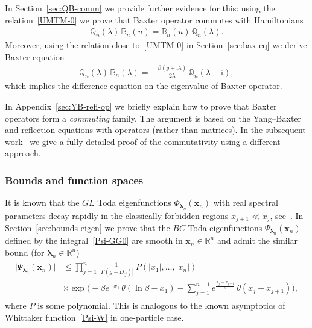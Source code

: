 \documentclass[11pt]{article}
\numberwithin{equation}{section}
\theoremstyle{plain}
\theoremstyle{definition}
\newcommand{\B}{\mathbb{B}}
\newcommand{\QQ}{\mathbb{Q}}
\renewcommand{\imath}{\mathrm{i}}
\begin{document}
In Section~\ref{sec:QB-comm} we provide further evidence for this: using the relation~\eqref{UMTM-0} we prove that Baxter operator commutes with Hamiltonians
\begin{align}
	\QQ_n(\lambda) \, \B_n(u) = \B_n(u) \, \QQ_n(\lambda).
\end{align}
Moreover, using the relation close to~\eqref{UMTM-0} in Section~\ref{sec:bax-eq} we derive Baxter equation
\begin{align} \label{baxt-eq}
	\QQ_n(\lambda)\,\B_n(\lambda)  = - \frac{\beta (g + \imath \lambda)}{2\lambda} \,\QQ_n(\lambda-\imath),
\end{align}
which implies the difference equation on the eigenvalue of Baxter operator. 

In Appendix~\ref{sec:YB-refl-op} we briefly explain how to prove that Baxter operators form a \textit{commuting} family. The argument is based on the Yang--Baxter and reflection equations with operators (rather than matrices). In the subsequent work~\cite{BDK} we give a fully detailed proof of the commutativity using a different approach.

\subsubsection{Bounds and function spaces} \label{sec:intro-bounds}

It is known that the $GL$ Toda eigenfunctions $\Phi_{\bm{\lambda}_n}(\bm{x}_n)$ with real spectral parameters decay rapidly in the classically forbidden regions $x_{j + 1} \ll x_{j}$, see~\cite[Proposition 4.1.3]{BK}. In Section~\ref{sec:bounds-eigen} we prove that the $BC$ Toda eigenfunctions $\Psi_{\bm{\lambda}_n}(\bm{x}_n)$ defined by the integral~\eqref{Psi-GG0} are smooth in $\bm{x}_n \in \mathbb{R}^n$ and admit the similar bound (for $\bm{\lambda}_n \in \mathbb{R}^n$)
\begin{align} 
	\begin{aligned}
		\bigl| \Psi_{\bm{\lambda}_n}(\bm{x}_n) \bigr| & \leq \prod_{j = 1}^n \frac{1}{| \Gamma(g - \imath \lambda_j)| } \,  P(|x_1|, \dots, |x_n|) \\[6pt]
		& \times \exp\Biggl( - \beta e^{-x_1} \, \theta(\ln \beta - x_1) - \sum_{j = 1}^{n - 1}  e^{ \frac{x_j - x_{j + 1} }{2} }  \, \theta(x_j - x_{j + 1} ) \Biggr),
	\end{aligned}
\end{align}
where $P$ is some polynomial. This is analogous to the known asymptotics of Whittaker function~\eqref{Psi-W} in one-particle case.
\end{document}
